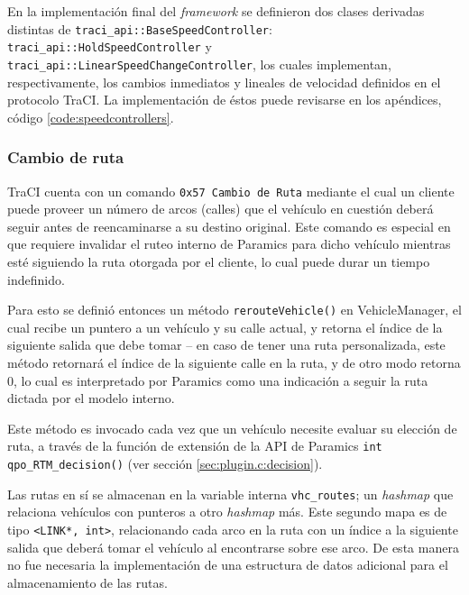 

En la implementación final del \emph{framework} se definieron dos clases derivadas distintas de \texttt{traci\_api::BaseSpeedController}: \texttt{traci\_api::HoldSpeedController} y \texttt{traci\_api::LinearSpeedChangeController}, los cuales implementan, respectivamente, los cambios inmediatos y lineales de velocidad definidos en el protocolo TraCI. La implementación de éstos puede revisarse en los apéndices, código \ref{code:speedcontrollers}.

\subsubsection{Cambio de ruta}\label{sec:routeoverride}

TraCI cuenta con un comando \texttt{0x57 Cambio de Ruta} mediante el cual un cliente puede proveer un número de arcos (calles) que el vehículo en cuestión deberá seguir antes de reencaminarse a su destino original. Este comando es especial en que requiere invalidar el ruteo interno de Paramics para dicho vehículo mientras esté siguiendo la ruta otorgada por el cliente, lo cual puede durar un tiempo indefinido.

Para esto se definió entonces un método \texttt{rerouteVehicle()} en VehicleManager, el cual recibe un puntero a un vehículo y su calle actual, y retorna el índice de la siguiente salida que debe tomar -- en caso de tener una ruta personalizada, este método retornará el índice de la siguiente calle en la ruta, y de otro modo retorna 0, lo cual es interpretado por Paramics como una indicación a seguir la ruta dictada por el modelo interno.



Este método es invocado cada vez que un vehículo necesite evaluar su elección de ruta, a través de la función de extensión de la API de Paramics \texttt{int qpo\_RTM\_decision()} (ver sección \ref{sec:plugin.c:decision}).

Las rutas en sí se almacenan en la variable interna \texttt{vhc\_routes}; un \emph{hashmap} que relaciona vehículos con punteros a otro \emph{hashmap} más. Este segundo mapa es de tipo 
\texttt{<LINK*, int>}, relacionando cada arco en la ruta con un índice a la siguiente salida que deberá tomar el vehículo al encontrarse sobre ese arco. De esta manera no fue necesaria la implementación de una estructura de datos adicional para el almacenamiento de las rutas.

